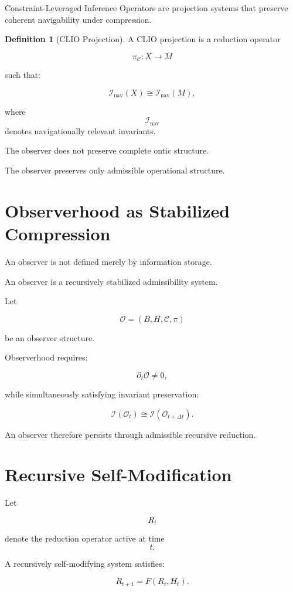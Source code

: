 \documentclass[12pt,openany]{book}
\theoremstyle{plain}
\theoremstyle{definition}
\newtheorem{definition}[theorem]{Definition}
\theoremstyle{remark}
\begin{document}
Constraint-Leveraged Inference Operators are projection systems
that preserve coherent navigability under compression.

\begin{definition}[CLIO Projection]
A CLIO projection is a reduction operator

\[
\pi_\mathcal{C} :
X \to M
\]

such that:

\[
\mathcal{I}_{\mathrm{nav}}(X)
\cong
\mathcal{I}_{\mathrm{nav}}(M),
\]

where
\[
\mathcal{I}_{\mathrm{nav}}
\]
denotes navigationally relevant invariants.
\end{definition}

The observer does not preserve complete ontic structure.

The observer preserves only admissible operational structure.

\section{Observerhood as Stabilized Compression}

An observer is not defined merely by information storage.

An observer is a recursively stabilized admissibility system.

Let

\[
\mathcal{O}
=
(B,H,\mathcal{C},\pi)
\]

be an observer structure.

Observerhood requires:

\[
\partial_t \mathcal{O}
\neq
0,
\]

while simultaneously satisfying invariant preservation:

\[
\mathcal{I}(\mathcal{O}_t)
\cong
\mathcal{I}(\mathcal{O}_{t+\Delta t}).
\]

An observer therefore persists through admissible recursive
reduction.

\section{Recursive Self-Modification}

Let

\[
R_t
\]

denote the reduction operator active at time
\[
t.
\]

A recursively self-modifying system satisfies:

\[
R_{t+1}
=
F(R_t,H_t).
\]
\end{document}
